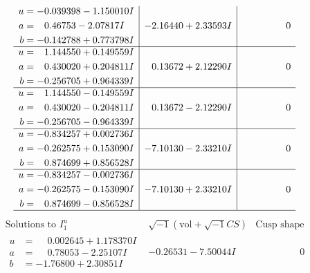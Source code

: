 \documentclass[1p]{elsarticle_modified}
\theoremstyle{definition}
\newcommand{\I}{\sqrt{-1}}
\begin{document}
$$\begin{array}{c|c|c}
\begin{aligned}
u &= -0.039398 - 1.150010 I \\
a &= \phantom{-}0.46753 - 2.07817 I \\
b &= -0.142788 + 0.773798 I\end{aligned}
 & -2.16440 + 2.33593 I & \phantom{-0.000000 } 0 \\ \hline\begin{aligned}
u &= \phantom{-}1.144550 + 0.149559 I \\
a &= \phantom{-}0.430020 + 0.204811 I \\
b &= -0.256705 + 0.964339 I\end{aligned}
 & \phantom{-}0.13672 + 2.12290 I & \phantom{-0.000000 } 0 \\ \hline\begin{aligned}
u &= \phantom{-}1.144550 - 0.149559 I \\
a &= \phantom{-}0.430020 - 0.204811 I \\
b &= -0.256705 - 0.964339 I\end{aligned}
 & \phantom{-}0.13672 - 2.12290 I & \phantom{-0.000000 } 0 \\ \hline\begin{aligned}
u &= -0.834257 + 0.002736 I \\
a &= -0.262575 + 0.153090 I \\
b &= \phantom{-}0.874699 + 0.856528 I\end{aligned}
 & -7.10130 - 2.33210 I & \phantom{-0.000000 } 0 \\ \hline\begin{aligned}
u &= -0.834257 - 0.002736 I \\
a &= -0.262575 - 0.153090 I \\
b &= \phantom{-}0.874699 - 0.856528 I\end{aligned}
 & -7.10130 + 2.33210 I & \phantom{-0.000000 } 0\\
 \hline 
 \end{array}$$\newpage$$\begin{array}{c|c|c}  
\text{Solutions to }I^u_{1}& \I (\text{vol} + \sqrt{-1}CS) & \text{Cusp shape}\\
 \hline 
\begin{aligned}
u &= \phantom{-}0.002645 + 1.178370 I \\
a &= \phantom{-}0.78053 - 2.25107 I \\
b &= -1.76800 + 2.30851 I\end{aligned}
 & -0.26531 - 7.50044 I & \phantom{-0.000000 } 0 \\ \hline\begin{aligned}

\end{aligned}
\end{array}$$
\end{document}
